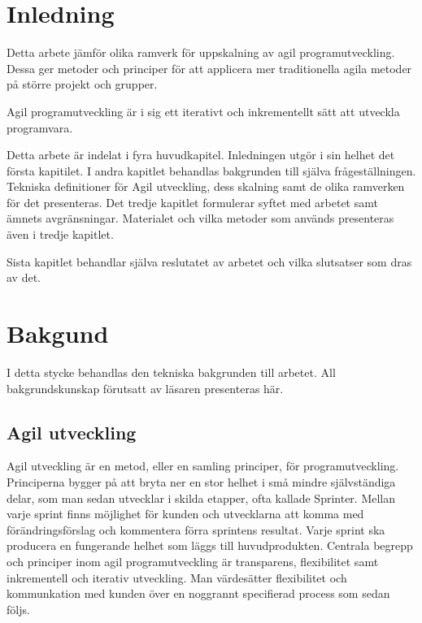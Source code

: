 \section{Inledning}

Detta arbete jämför olika ramverk för uppskalning av agil programutveckling. Dessa ger metoder och principer för att applicera mer traditionella agila metoder på större projekt och grupper.

Agil programutveckling är i sig ett iterativt och inkrementellt sätt att utveckla programvara.

Detta arbete är indelat i fyra huvudkapitel. Inledningen utgör i sin helhet det första kapitilet.
I andra kapitlet behandlas bakgrunden till själva frågeställningen. Tekniska definitioner för Agil utveckling, dess skalning samt de olika ramverken för det presenteras. 
Det tredje kapitlet formulerar syftet med arbetet samt ämnets avgränsningar. Materialet och vilka metoder som används presenteras även i tredje kapitlet.

Sista kapitlet behandlar själva reslutatet av arbetet och vilka slutsatser som dras av det.

\newpage

\section{Bakgund} 	


I detta stycke behandlas den tekniska bakgrunden till arbetet. All bakgrundskunskap förutsatt av läsaren presenteras här.

\subsection{Agil utveckling}

Agil utveckling är en metod, eller en samling principer, för programutveckling. Principerna bygger på att bryta ner en stor helhet i små mindre självständiga delar, som man sedan utvecklar i skilda etapper, ofta kallade Sprinter.
Mellan varje sprint finns möjlighet för kunden och utvecklarna att komma med förändringsförslag och kommentera förra sprintens resultat. Varje sprint ska producera en fungerande helhet som läggs till huvudprodukten. Centrala begrepp och principer inom agil programutveckling är transparens, flexibilitet samt inkrementell och iterativ utveckling. Man värdesätter flexibilitet och kommunkation med kunden över en noggrannt specifierad process som sedan följs. \cite{agile_manifesto}

